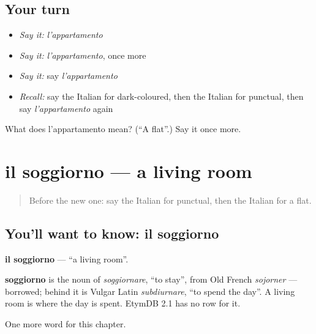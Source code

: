 \subsection*{Your turn}
\begin{itemize}
\raggedright
  \item \emph{Say it:} \emph{l'appartamento}
  \item \emph{Say it:} \emph{l'appartamento}, once more
  \item \emph{Say it:} say \emph{l'appartamento}
  \item \emph{Recall:} say the Italian for dark-coloured, then the Italian for punctual, then say \emph{l'appartamento} again
\end{itemize}

\begin{tcolorbox}[breakable,colback=teal!4,colframe=teal!35!black,title={Before you move on}]
What does l'appartamento mean? (\textquotedblleft{}A flat\textquotedblright{}.) Say it once more.
\end{tcolorbox}
\section[il soggiorno]{il soggiorno — a living room}

\label{lesson:IT-C159-soggiorno}



\begin{quote}
Before the new one: say the Italian for punctual, then the Italian for a flat.
\end{quote}

\subsection*{You'll want to know: il soggiorno}
\textbf{il soggiorno} — \textquotedblleft{}a living room\textquotedblright{}.

\begin{cousinweb}
\textbf{soggiorno} is the noun of \emph{soggiornare}, \textquotedblleft{}to stay\textquotedblright{}, from Old French \emph{sojorner} — borrowed; behind it is Vulgar Latin \emph{subdiurnare}, \textquotedblleft{}to spend the day\textquotedblright{}. A living room is where the day is spent. EtymDB 2.1 has no row for it.
\end{cousinweb}

\begin{grammarlens}[title={What you've built}]
One more word for this chapter.
\end{grammarlens}

